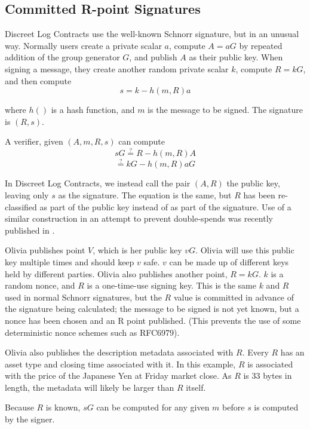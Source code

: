 \documentclass[11pt]{article}
\begin{document}
\subsection*{Committed R-point Signatures}

Discreet Log Contracts use the well-known Schnorr signature\cite{schnorr1990efficient}, but in an unusual way.  Normally users create a private scalar \(a\), compute \(A = aG\) by repeated addition of the group generator \(G\), and publish \(A\) as their public key.  When signing a message, they create another random private scalar \(k\), compute \(R = kG\), and then compute  \[s = k - h(m, R)a\]

where \(h()\) is a hash function, and \(m\) is the message to be signed.  The signature is \((R, s)\).

A verifier, given \((A, m, R, s)\) can compute
\[sG \stackrel{?}{=} R - h(m, R)A\]
\[\stackrel{?}{=} kG - h(m, R)aG\]

In Discreet Log Contracts, we instead call the pair \((A, R)\) the public key, leaving only \(s\) as the signature.  The equation is the same, but \(R\) has been re-classified as part of the public key instead of as part of the signature.  Use of a similar construction in an attempt to prevent double-spends was recently published in \cite{cryptoeprint:2017:394}.

Olivia publishes point \(V\), which is her public key \(vG\).  Olivia will use this public key multiple times and should keep \(v\) safe.  \(v\) can be made up of different keys held by different parties.  Olivia also publishes another point, \(R = kG\).  \(k\) is a random nonce, and \(R\) is a one-time-use signing key.  This is the same \(k\) and \(R\)  used in normal Schnorr signatures, but the \(R\) value is committed in advance of the signature being calculated; the message to be signed is not yet known, but a nonce has been chosen and an R point published.  (This prevents the use of some deterministic nonce schemes such as RFC6979\cite{rfc}).

Olivia also publishes the description metadata associated with \(R\).  Every \(R\) has an asset type and closing time associated with it.  In this example, \(R\) is associated with the price of the Japanese Yen at Friday market close.  As \(R\) is 33 bytes in length, the metadata will likely be larger than \(R\) itself.

Because \(R\) is known, \(sG\) can be computed for any given \(m\) before \(s\) is computed by the signer.
\end{document}
